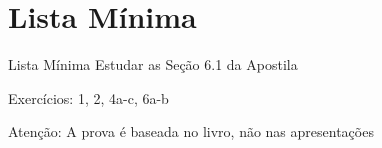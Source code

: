 \documentclass[fleqn,utf8,aspectratio=169,12pt]{beamer}
\begin{document}
\section{Lista Mínima}

\begin{frame}{Lista Mínima}
  Estudar as Seção 6.1 da Apostila

  \vspace{\baselineskip}
  Exercícios: 1, 2, 4a-c, 6a-b

  \vfill
  Atenção: A prova é baseada no livro, não nas apresentações
\end{frame}

\end{document}
